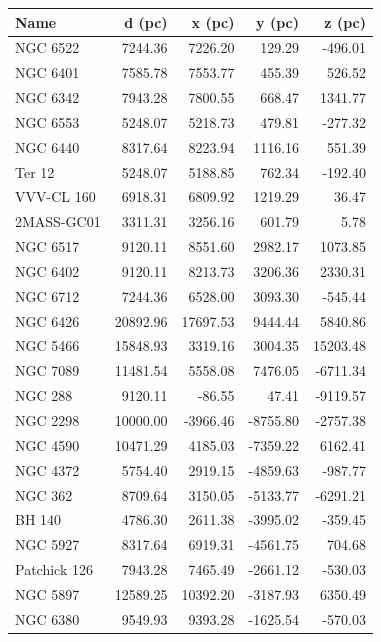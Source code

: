 \begin{description}
  \begin{center}
  \begin{tabular}{|l|r|r|r|r|}
  \hline
  \textbf{Name} & \textbf{d (pc)} & \textbf{x (pc)} & \textbf{y (pc)} & \textbf{z (pc)}\\
  \hline
  NGC 6522    &  7244.36 &  7226.20 &   129.29 &  -496.01\\
  NGC 6401    &  7585.78 &  7553.77 &   455.39 &   526.52\\
  NGC 6342    &  7943.28 &  7800.55 &   668.47 &  1341.77\\
  NGC 6553    &  5248.07 &  5218.73 &   479.81 &  -277.32\\
  NGC 6440    &  8317.64 &  8223.94 &  1116.16 &   551.39\\
  Ter 12      &  5248.07 &  5188.85 &   762.34 &  -192.40\\
  VVV-CL 160  &  6918.31 &  6809.92 &  1219.29 &    36.47\\
  2MASS-GC01  &  3311.31 &  3256.16 &   601.79 &     5.78\\
  NGC 6517    &  9120.11 &  8551.60 &  2982.17 &  1073.85\\
  NGC 6402    &  9120.11 &  8213.73 &  3206.36 &  2330.31\\
  NGC 6712    &  7244.36 &  6528.00 &  3093.30 &  -545.44\\
  NGC 6426    & 20892.96 & 17697.53 &  9444.44 &  5840.86\\
  NGC 5466    & 15848.93 &  3319.16 &  3004.35 & 15203.48\\
  NGC 7089    & 11481.54 &  5558.08 &  7476.05 & -6711.34\\
  NGC 288     &  9120.11 &   -86.55 &    47.41 & -9119.57\\
  NGC 2298    & 10000.00 & -3966.46 & -8755.80 & -2757.38\\
  NGC 4590    & 10471.29 &  4185.03 & -7359.22 &  6162.41\\
  NGC 4372    &  5754.40 &  2919.15 & -4859.63 &  -987.77\\
  NGC 362     &  8709.64 &  3150.05 & -5133.77 & -6291.21\\
  BH 140      &  4786.30 &  2611.38 & -3995.02 &  -359.45\\
  NGC 5927    &  8317.64 &  6919.31 & -4561.75 &   704.68\\
  Patchick 126&  7943.28 &  7465.49 & -2661.12 &  -530.03\\
  NGC 5897    & 12589.25 & 10392.20 & -3187.93 &  6350.49\\
  NGC 6380    &  9549.93 &  9393.28 & -1625.54 &  -570.03\\

\end{tabular}
\end{center}
\end{description}
